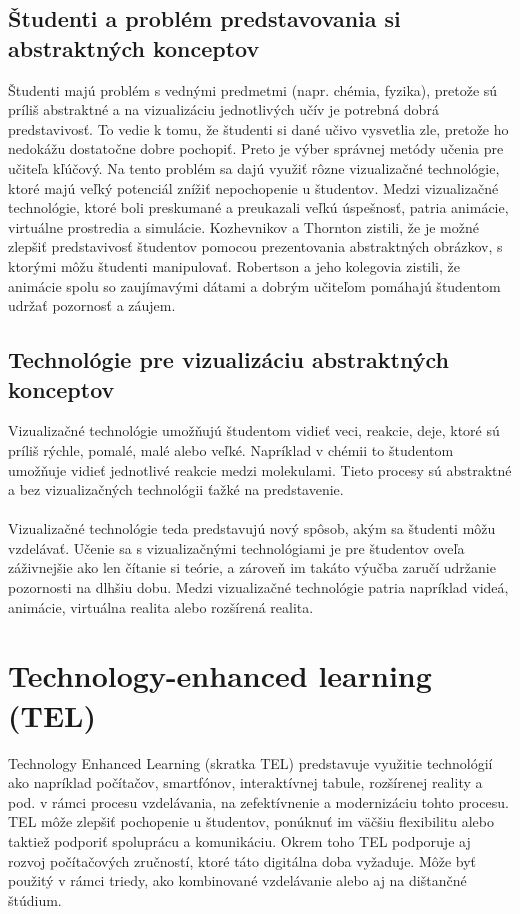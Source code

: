 \documentclass[10pt,oneside,slovak,a4paper]{article}
\begin{document}
\subsection{Študenti a problém predstavovania si abstraktných konceptov} \label{zakladnyProblem:abstraktneKoncepty}
Študenti majú problém s vednými predmetmi (napr. chémia, fyzika), pretože sú príliš abstraktné a na vizualizáciu jednotlivých učív je potrebná dobrá predstavivosť.\cite{Saidin2015}
To vedie k tomu, že študenti si dané učivo vysvetlia zle, pretože ho nedokážu dostatočne dobre pochopiť.
Preto je výber správnej metódy učenia pre učiteľa kľúčový.
Na tento problém sa dajú využiť rôzne vizualizačné technológie, ktoré majú veľký potenciál znížiť nepochopenie u študentov.
Medzi vizualizačné technológie, ktoré boli preskumané a preukazali veľkú úspešnosť, patria animácie, virtuálne prostredia a simulácie.
Kozhevnikov a Thornton zistili, že je možné zlepšiť predstavivosť študentov pomocou prezentovania abstraktných obrázkov, s ktorými môžu študenti manipulovať.
Robertson a jeho kolegovia zistili, že animácie spolu so zaujímavými dátami a dobrým učiteľom pomáhajú študentom udržať pozornosť a záujem.
\subsection{Technológie pre vizualizáciu abstraktných konceptov} \label{zakladnyProblem:technologie}
Vizualizačné technológie umožňujú študentom vidieť veci, reakcie, deje, ktoré sú príliš rýchle, pomalé, malé alebo veľké.\cite{Saidin2015}
Napríklad v chémii to študentom umožňuje vidieť jednotlivé reakcie medzi molekulami.
Tieto procesy sú abstraktné a bez vizualizačných technológii ťažké na predstavenie.
\\\\
Vizualizačné technológie teda predstavujú nový spôsob, akým sa študenti môžu vzdelávať.
Učenie sa s vizualizačnými technológiami je pre študentov oveľa záživnejšie ako len čítanie si teórie, a zároveň im takáto výučba zaručí udržanie pozornosti na dlhšiu dobu.
Medzi vizualizačné technológie patria napríklad videá, animácie, virtuálna realita alebo rozšírená realita.

\section{Technology-enhanced learning (TEL)} \label{tel}
Technology Enhanced Learning (skratka TEL) predstavuje využitie technológií ako napríklad počítačov, smartfónov, interaktívnej tabule, rozšírenej reality a pod. v rámci procesu vzdelávania, na zefektívnenie a modernizáciu tohto procesu.\cite{TEL} 
TEL môže zlepšiť pochopenie u študentov, ponúknuť im väčšiu flexibilitu alebo taktiež podporiť spoluprácu a komunikáciu. 
Okrem toho TEL podporuje aj rozvoj počítačových zručností, ktoré táto digitálna doba vyžaduje. 
Môže byť použitý v rámci triedy, ako kombinované vzdelávanie alebo aj na dištančné štúdium.
\end{document}
